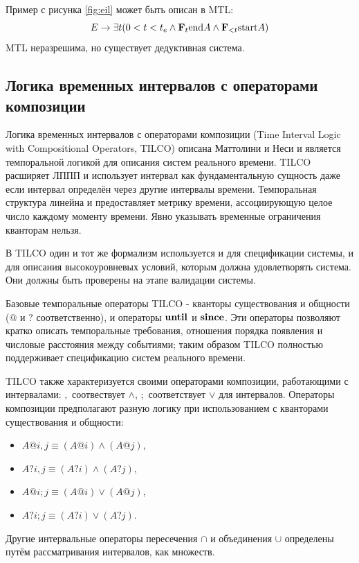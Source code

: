 		\FloatBarrier
		Пример с рисунка \ref{fig:eil} может быть описан в MTL: \[E\rightarrow \exists t(0<t<t_e \land \textbf{F}_t \text{end}A\land \textbf{F}_{<t} \text{start}A) \]
		MTL неразрешима, но существует дедуктивная система.
		\subsection{Логика временных интервалов с операторами композиции}
		Логика временных интервалов с операторами композиции (Time Interval Logic with Compositional Operators, TILCO) описана Маттолини и Неси \cite{TILCO} и является темпоральной логикой для описания систем реального времени.
		TILCO расширяет ЛППП и использует интервал как фундаментальную сущность даже если интервал определён через другие интервалы времени.
		Темпоральная структура линейна и предоставляет метрику времени, ассоциирующую целое число каждому моменту времени. 
		Явно указывать временные ограничения кванторам нельзя.
		
		В TILCO один и тот же формализм используется и для спецификации системы, и для описания высокоуровневых условий, которым должна удовлетворять система.
		Они должны быть проверены на этапе валидации системы.
		
		Базовые темпоральные операторы TILCO - кванторы существования и общности ($ @ $ и $ ? $ соответственно), и операторы $ \text{\textbf{until}} $ и $ \text{\textbf{since}} $.
		Эти операторы позволяют кратко описать темпоральные требования, отношения порядка появления и числовые расстояния между событиями; таким образом TILCO полностью поддерживает спецификацию систем реального времени.
		
		TILCO также характеризуется своими операторами композиции, работающими с интервалами: $ , $ соотвествует $ \land $, $ ; $ соответствует $ \lor $ для интервалов.
		Операторы композиции предполагают разную логику при использованием с кванторами существования и общности:
		\begin{itemize}
			\item $ A @ i,j \equiv (A@i)\land(A@j) $,
			\item $ A?i,j \equiv (A?i)\land(A?j) $,
			\item $ A@i;j \equiv (A@i) \lor (A@j) $,
			\item $ A?i;j \equiv (A?i) \lor (A?j) $.
		\end{itemize}
		Другие интервальные операторы пересечения $ \cap $ и объединения $ \cup $ определены путём рассматривания интервалов, как множеств.
		
